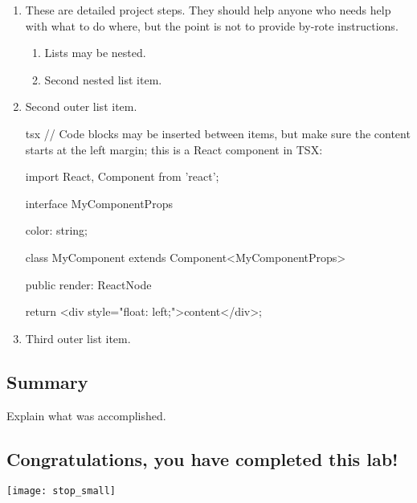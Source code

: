\documentclass[../workbook]{subfiles}
\begin{document}
\begin{enumerate}
    \item These are detailed project steps. They should help anyone who needs help with what to do where, but the point is not to provide by-rote instructions.
        \begin{enumerate}
            \item Lists may be nested.
            \item Second nested list item.
        \end{enumerate}
    \item Second outer list item.
    \begin{codeblock}{tsx}
// Code blocks may be inserted between items, but make sure the content starts at the left margin; this is a React component in TSX:

import React, { Component } from 'react';

interface MyComponentProps {

    color: string;
}

class MyComponent extends Component<MyComponentProps> {

    public render: ReactNode {

        return <div style="float: left;">content</div>;
    }
}
    \end{codeblock}%
    \item Third outer list item.
\end{enumerate}



\subsection*{Summary}

\par{
    Explain what was accomplished.
}



\subsection*{\textbf{Congratulations, you have completed this lab!}}
\texttt{[image: stop\_small]}
\end{document}
